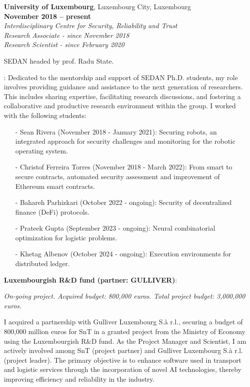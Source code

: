 \documentclass[margin,line]{resume}
\begin{document}
\begin{resume}
\textbf{University of Luxembourg}, Luxembourg City, Luxembourg\\  \phantom{.} \hfill \textbf{November 2018 -- present}\\
\textit{Interdisciplinary Centre for Security, Reliability and Trust}\hfill\\
\textit{Research Associate - since November 2018}\hfill\\
\textit{Research Scientist - since February 2020}\hfill  
\vspace{-3mm}\\\vspace{-1mm}
\begin{list2}
	\item {} SEDAN headed by prof. Radu State.
	\item {}: Dedicated to the mentorship and support of SEDAN Ph.D. students, my role involves providing guidance and assistance to the next generation of researchers. This includes sharing expertise, facilitating research discussions, and fostering a collaborative and productive research environment within the group. I worked with the following students:
	\begin{itemize}
		\item[-] Sean Rivera (November 2018 - January 2021): Securing robots, an integrated approach for security challenges and monitoring for the robotic operating system.
		\item[-] Christof Ferreira Torres (November 2018 - March 2022): From smart to secure contracts, automated security assessment and improvement of Ethereum smart contracts.
		\item[-] Bahareh Parhizkari (October 2022 - ongoing): Security of decentralized finance (DeFi) protocols.
		\item[-] Prateek Gupta (September 2023 - ongoing): Neural combinatorial optimization for logistic problems.
		\item[-] Khetag Albenov (October 2024 - ongoing): Execution environments for distributed ledger.
	\end{itemize}
	
	\item \filbreak\textbf{Luxembourgish R\&D fund (partner: GULLIVER)}: 
	
	\emph{On-going project. Acquired budget: 800,000 euros. Total project budget: 3,000,000 euros.}
	
	I acquired a partnership with Gulliver Luxembourg S.à r.l., securing a budget of 800,000 million euros for SnT in a granted project from the Ministry of Economy using the Luxembourgish R\&D fund. As the Project Manager and Scientist, I am actively involved among SnT (project partner) and Gulliver Luxembourg S.à r.l. (project leader). The primary objective is to enhance software used in transport and logistic services through the incorporation of novel AI technologies, thereby improving efficiency and reliability in the industry.


\end{list2}
\end{resume}
\end{document}
